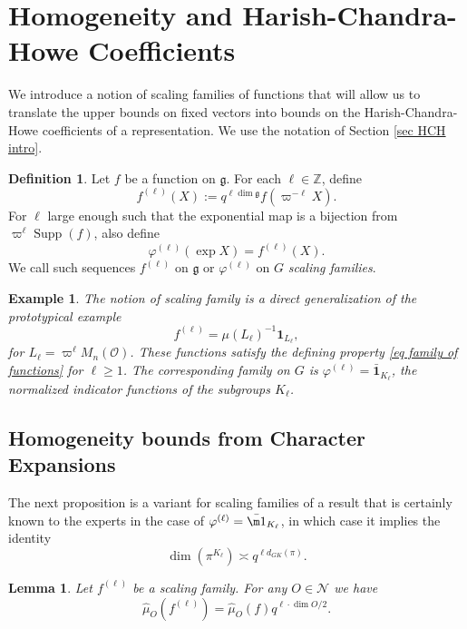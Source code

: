 \documentclass{amsart}
\DeclareMathOperator{\Supp}{Supp}
\newcommand{\mf}[1]{\mathfrak{#1}}
\newcommand{\mc}[1]{\mathcal{#1}}
\newcommand{\Z}{\mathbb Z}
\newcommand{\1}{\m 1}
\newtheorem{lem}[thm]{Lemma}
\newtheorem{ex}[thm]{Example}
\theoremstyle{remark}
\theoremstyle{definition}
\newtheorem{dfn}[thm]{Definition}
\numberwithin{equation}{subsection}
\begin{document}
\section{Homogeneity and Harish-Chandra-Howe Coefficients}\label{sec:HCH}
We introduce a notion of scaling families of functions that will allow us to translate the upper bounds on fixed vectors into bounds on the Harish-Chandra-Howe coefficients of a representation. We use the notation of Section \ref{sec HCH intro}.
\begin{dfn}
Let $f$ be a function on $\mf g$. For each $\ell \in \Z$, define
\begin{equation} \label{eq family of functions}
f^{(\ell)}(X) := q^{\ell \dim \mf g}f(\varpi^{-\ell} X).
\end{equation}
For $\ell$ large enough such that the exponential map is a bijection from $\varpi^{\ell} \Supp(f)$, also define
\[
\varphi^{(\ell)}(\exp X) = f^{(\ell)}(X). 
\]
We call such sequences $f^{(\ell)}$ on $\mf g$ or $\varphi^{(\ell)}$ on $G$ \emph{scaling families}. 
\end{dfn}

\begin{ex}\label{ex:scalingindicators}
The notion of scaling family is a direct generalization of the prototypical example \[f^{(\ell)} = \mu(L_{\ell})^{-1}\mathbf{1}_{L_{\ell}},\] for $L_\ell = \varpi^\ell M_n(\mc O)$.  These functions satisfy the defining property \eqref{eq family of functions} for $\ell \geq 1$. The corresponding family on $G$ is $\varphi^{(\ell)} = \bar{\mathbf{1}}_{K_\ell}$, the normalized indicator functions of the subgroups $K_{\ell}$. 
\end{ex}


\subsection{Homogeneity bounds from Character Expansions}

The next proposition is a variant for scaling families of a result that is certainly known to the experts in the case of $\varphi^{(\ell)} = \bar{\1}_{K_\ell}$, in which case it implies the identity 
\[
\dim(\pi^{K_\ell}) \asymp q^{\ell d_{GK}(\pi)}.
\]

\begin{lem}\label{lem:homogenity}
Let $f^{(\ell)}$ be a scaling family. For any $O \in \mc N$ we have %
\[ 
\hat \mu_O(f^{(\ell)}) = \hat{\mu}_O(f)q^{\ell \cdot \dim O/2}.
\]
\end{lem}
\end{document}
